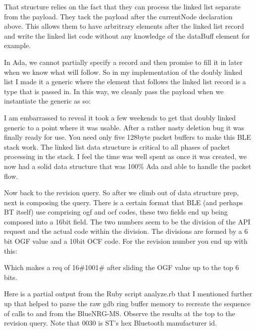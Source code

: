 \documentclass[11pt]{article}
\numberwithin{figure}{section}
\begin{document}
{
\selectfont

}

That structure relies on the fact that they can process the linked
list separate from the payload. They tack the payload after the
currentNode declaration above. This allows them to have arbritrary
elements after the linked list record and write the linked list code
without any knowledge of the dataBuff element for example.

In Ada, we cannot partially specify a record and then promise to fill
it in later when we know what will follow. So in my implementation of
the doubly linked list I made it a generic where the element that
follows the linked list record is a type that is passed in. In this
way, we cleanly pass the payload when we instantiate the generic as
so:

{
\selectfont

}

I am embarrassed to reveal it took a few weekends to get that doubly
linked generic to a point where it was usable. After a rather nasty
deletion bug it was finally ready for use. You need only five 128byte
packet buffers to make this BLE stack work. The linked list data
structure is critical to all phases of packet processing in the
stack. I feel the time was well spent as once it was created, we now
had a solid data structure that was 100\% Ada and able to handle the
packet flow.

Now back to the revision query. So after we climb out of data
structure prep, next is composing the query. There is a certain format
that BLE (and perhaps BT itself) use comprising ogf and ocf codes,
these two fields end up being composed into a 16bit field. The two
numbers seem to be the division of the API request and the actual code
within the division. The divisions are formed by a 6 bit OGF value and
a 10bit OCF code. For the revision number you end up with this:

{
\selectfont

}

Which makes a req of 16\#1001\# after sliding the OGF value up to the
top 6 bits.

Here is a partial output from the Ruby script analyze.rb that I
mentioned further up that helped to parse the raw gdb ring buffer
memory to recreate the sequence of calls to and from the
BlueNRG-MS. Observe the results at the top to the revision query. Note
that 0030 is ST's hex Bluetooth manufacturer id.

{
\selectfont

}
\end{document}
